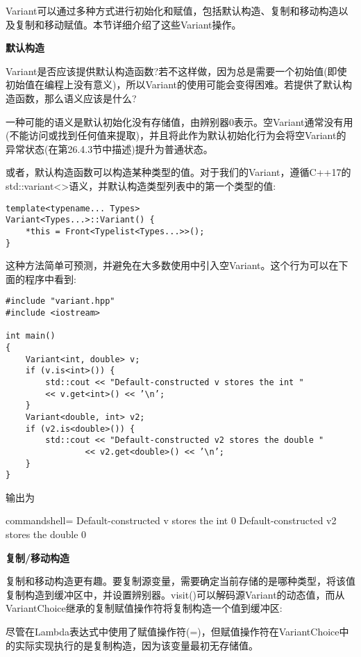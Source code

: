 Variant可以通过多种方式进行初始化和赋值，包括默认构造、复制和移动构造以及复制和移动赋值。本节详细介绍了这些Variant操作。

\noindent
\textbf{默认构造}

Variant是否应该提供默认构造函数?若不这样做，因为总是需要一个初始值(即使初始值在编程上没有意义)，所以Variant的使用可能会变得困难。若提供了默认构造函数，那么语义应该是什么?

一种可能的语义是默认初始化没有存储值，由辨别器0表示。空Variant通常没有用(不能访问或找到任何值来提取)，并且将此作为默认初始化行为会将空Variant的异常状态(在第26.4.3节中描述)提升为普通状态。

或者，默认构造函数可以构造某种类型的值。对于我们的Variant，遵循C++17的std::variant<>语义，并默认构造类型列表中的第一个类型的值:

\begin{lstlisting}[style=styleCXX]
template<typename... Types>
Variant<Types...>::Variant() {
	*this = Front<Typelist<Types...>>();
}
\end{lstlisting}

这种方法简单可预测，并避免在大多数使用中引入空Variant。这个行为可以在下面的程序中看到:

\begin{lstlisting}[style=styleCXX]
#include "variant.hpp"
#include <iostream>

int main()
{
	Variant<int, double> v;
	if (v.is<int>()) {
		std::cout << "Default-constructed v stores the int "
		<< v.get<int>() << ’\n’;
	}
	Variant<double, int> v2;
	if (v2.is<double>()) {
		std::cout << "Default-constructed v2 stores the double "
				<< v2.get<double>() << ’\n’;
	}
}
\end{lstlisting}

输出为

\begin{tcblisting}{commandshell={}}
Default-constructed v stores the int 0
Default-constructed v2 stores the double 0
\end{tcblisting}

\noindent
\textbf{复制/移动构造}

复制和移动构造更有趣。要复制源变量，需要确定当前存储的是哪种类型，将该值复制构造到缓冲区中，并设置辨别器。visit()可以解码源Variant的动态值，而从VariantChoice继承的复制赋值操作符将复制构造一个值到缓冲区:

\begin{tcolorbox}[colback=webgreen!5!white,colframe=webgreen!75!black]
\hspace*{0.75cm}尽管在Lambda表达式中使用了赋值操作符(=)，但赋值操作符在VariantChoice中的实际实现执行的是复制构造，因为该变量最初无存储值。
\end{tcolorbox}

